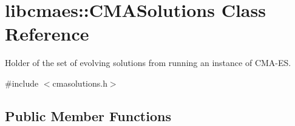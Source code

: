 \hypertarget{classlibcmaes_1_1CMASolutions}{\section{libcmaes\-:\-:C\-M\-A\-Solutions Class Reference}
\label{classlibcmaes_1_1CMASolutions}
}


Holder of the set of evolving solutions from running an instance of C\-M\-A-\/\-E\-S.  




{\ttfamily \#include $<$cmasolutions.\-h$>$}

\subsection*{Public Member Functions}
